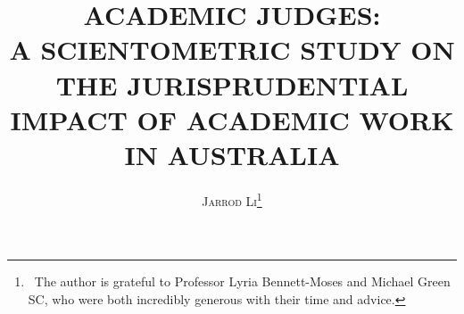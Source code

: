 \documentclass[12pt]{article}
\begin{document}

\thispagestyle{plain}

\title{\vspace{-25mm}\large{\textbf{\uppercase{Academic Judges:\\A Scientometric Study on the Jurisprudential Impact of Academic Work in Australia}}}}
\date{}
\author{\textsc{Jarrod Li}\thanks{\;\, The author is grateful to Professor Lyria Bennett-Moses and Michael Green SC, who were both incredibly generous with their time and advice.}}
\maketitle


\newpage

\thispagestyle{plain}


\tableofcontents
\newpage

\pagestyle{fancy}











\end{document}
